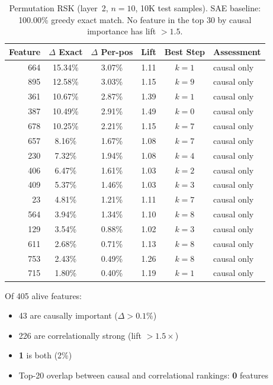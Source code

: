 \documentclass[10pt]{article}
\begin{document}
\begin{table}[h]
\centering
\caption{Permutation RSK (layer~2, $n{=}10$, 10K test samples). SAE
baseline: 100.00\% greedy exact match. No feature in the top 30 by causal
importance has lift $> 1.5$.}
\label{tab:perm}
\small
\begin{tabular}{rccccl}
\toprule
Feature & $\Delta$ Exact & $\Delta$ Per-pos & Lift & Best Step & Assessment \\
\midrule
664 & 15.34\% & 3.07\% & 1.11 & $k{=}1$ & causal only \\
895 & 12.58\% & 3.03\% & 1.15 & $k{=}9$ & causal only \\
361 & 10.67\% & 2.87\% & 1.39 & $k{=}1$ & causal only \\
387 & 10.49\% & 2.91\% & 1.49 & $k{=}0$ & causal only \\
678 & 10.25\% & 2.21\% & 1.15 & $k{=}7$ & causal only \\
657 &  8.16\% & 1.67\% & 1.08 & $k{=}7$ & causal only \\
230 &  7.32\% & 1.94\% & 1.08 & $k{=}4$ & causal only \\
406 &  6.47\% & 1.61\% & 1.03 & $k{=}2$ & causal only \\
409 &  5.37\% & 1.46\% & 1.03 & $k{=}3$ & causal only \\
 23 &  4.81\% & 1.21\% & 1.11 & $k{=}7$ & causal only \\
564 &  3.94\% & 1.34\% & 1.10 & $k{=}8$ & causal only \\
129 &  3.54\% & 0.88\% & 1.02 & $k{=}3$ & causal only \\
611 &  2.68\% & 0.71\% & 1.13 & $k{=}8$ & causal only \\
753 &  2.43\% & 0.49\% & 1.26 & $k{=}8$ & causal only \\
715 &  1.80\% & 0.40\% & 1.19 & $k{=}1$ & causal only \\
\bottomrule
\end{tabular}
\end{table}

Of 405 alive features:
\begin{itemize}
\item 43 are causally important ($\Delta > 0.1\%$)
\item 226 are correlationally strong (lift $> 1.5\times$)
\item \textbf{1} is both (2\%)
\item Top-20 overlap between causal and correlational rankings: \textbf{0}
features
\end{itemize}
\end{document}
